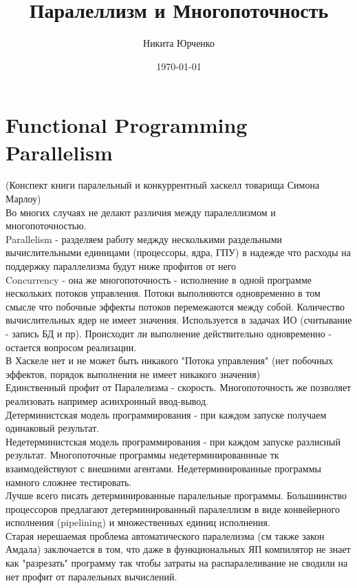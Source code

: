 \documentclass[10pt,a4paper]{article}
\date{\today}
\author{Никита Юрченко}
\title{Паралеллизм и Многопоточность}
\begin{document}
\maketitle
\newpage
{}  

\section{Functional Programming Parallelism}
(Конспект книги паралельный и конкуррентный хаскелл товарища Симона Марлоу)\\
Во многих случаях не делают различия между паралеллизмом и многопоточностью.\\
Parallelism - разделяем работу меджду несколькими раздельными вычислительными единицами (процессоры, ядра, ГПУ) в надежде что расходы на поддержку параллелизма будут ниже профитов от него\\
Concurrency - она же многопоточность - исполнение в одной программе нескольких потоков управления. Потоки выполняются одновременно в том смысле что побочные эффекты потоков перемежаются между собой. Количество вычислительных ядер не имеет значения. Используется в задачах ИО (считывание - запись БД и пр). Происходит ли выполнение действительно одновременно - остается вопросом реализации.\\
В Хаскеле нет и не может быть никакого "Потока управления" (нет побочных эффектов, порядок выполнения не имеет никакого значения)\\
Единственный профит от Паралелизма - скорость. Многопоточность же позволяет реализовать например асинхронный ввод-вывод. \\
Детерминистская модель программирования - при каждом запуске получаем одинаковый результат. \\
Недетерминистская модель программирования - при каждом запуске разлисный результат. Многопоточные программы недетерминированнные тк взаимодействуют с внешними агентами. Недетерминированные программы намного сложнее тестировать.\\
Лучше всего писать детерминированные паралельные программы. Большиинство процессоров предлагают детерминированный паралеллизм в виде конвейерного исполнения (pipelining) и множественных единиц исполнения. \\
Старая нерешаемая проблема автоматического паралелизма (см также закон Амдала) заключается в том, что даже в функциональных ЯП компилятор не знает как "разрезать" программу так чтобы затраты на распаралеливание не сводили на нет профит от паралельных вычислений.\\
\end{document}
